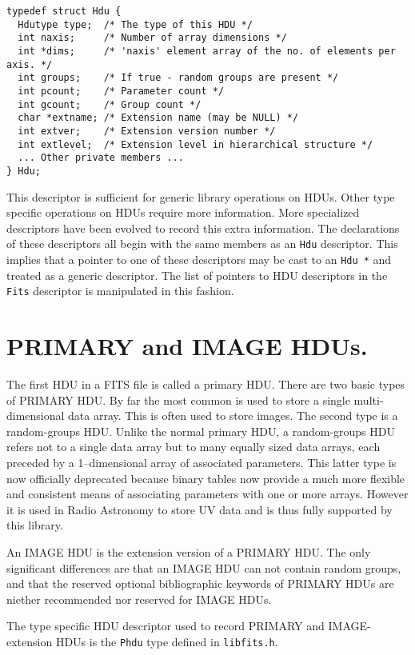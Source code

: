\begin{verbatim}
typedef struct Hdu {
  Hdutype type;  /* The type of this HDU */
  int naxis;     /* Number of array dimensions */
  int *dims;     /* 'naxis' element array of the no. of elements per axis. */
  int groups;    /* If true - random groups are present */
  int pcount;    /* Parameter count */
  int gcount;    /* Group count */
  char *extname; /* Extension name (may be NULL) */
  int extver;    /* Extension version number */
  int extlevel;  /* Extension level in hierarchical structure */
  ... Other private members ...
} Hdu;
\end{verbatim}

This descriptor is sufficient for generic library operations on HDUs.
Other type specific operations on HDUs require more information. More
specialized descriptors have been evolved to record this extra
information. The declarations of these descriptors all begin with the
same members as an \verb`Hdu` descriptor. This implies that a pointer
to one of these descriptors may be cast to an \verb`Hdu *` and treated
as a generic descriptor. The list of pointers to HDU descriptors in
the \verb`Fits` descriptor is manipulated in this fashion.

\label{primhdu}\section{PRIMARY and IMAGE HDUs.}

The first HDU in a FITS file is called a primary HDU. There are two
basic types of PRIMARY HDU. By far the most common is used to store a
single multi-dimensional data array. This is often used to store
images. The second type is a random-groups HDU. Unlike the normal
primary HDU, a random-groups HDU refers not to a single data array but
to many equally sized data arrays, each preceded by a 1--dimensional
array of associated parameters. This latter type is now officially
deprecated because binary tables now provide a much more flexible and
consistent means of associating parameters with one or more arrays.
However it is used in Radio Astronomy to store UV data and is thus
fully supported by this library.

An IMAGE HDU is the extension version of a PRIMARY HDU. The only
significant differences are that an IMAGE HDU can not contain random
groups, and that the reserved optional bibliographic keywords of
PRIMARY HDUs are niether recommended nor reserved for IMAGE HDUs.

The type specific HDU descriptor used to record PRIMARY and
IMAGE-extension HDUs is the \verb`Phdu` type defined in
\verb`libfits.h`.

